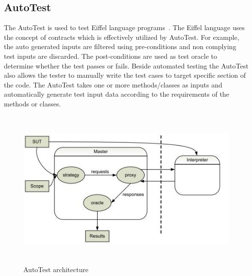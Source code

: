 \subsection{AutoTest} \label{autotest_2}
The AutoTest is used to test Eiffel language programs~\cite{ciupa2007automatic}. The Eiffel language uses the concept of contracts which is effectively utilized by AutoTest. For example, the auto generated inputs are filtered using pre-conditions and non complying test inputs are discarded. The post-conditions are used as test oracle to determine whether the test passes or fails. Beside automated testing the AutoTest also allows the tester to manually write the test cases to target specific section of the code. The AutoTest takes one or more methods/classes as inputs and automatically generate test input data according to the requirements of the methods or classes.
\bigskip
\begin{figure}[h]
	\centering
	\includegraphics[width=14cm, height=8cm]{chapter2/autotest.png}
	\caption{AutoTest architecture~\cite{leitner2007reconciling}}
	\label{fig:autotest}
\end{figure}

